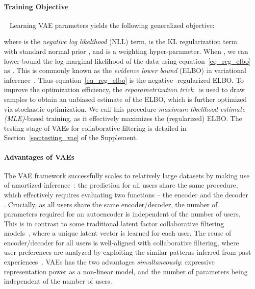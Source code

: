 \documentclass{article} \usepackage{iclr2020_conference,times}
\def\eqref#1{equation~\ref{#1}}
\begin{document}
\paragraph{Training Objective}~\hspace{-2mm}
Learning VAE parameters  yields the following generalized objective:
\vspace{-1mm}

where  is the {\it negative log likelihood} (NLL) term,  is the KL regularization term with standard normal prior , and  is a weighting hyper-parameter.
When , we can lower-bound the log marginal likelihood of the data using \eqref{eq_reg_elbo} as
.
This is commonly known as the {\it evidence lower bound} (ELBO) in variational inference~\citep{blei2017variational}. Thus \eqref{eq_reg_elbo} is the negative -regularized ELBO. To improve the optimization efficiency, the {\it reparametrization trick}~\citep{kingma2013auto,rezende2014stochastic} is used to draw samples  to obtain an unbiased estimate of the ELBO, which is further optimized via stochastic optimization.
We call this procedure {\it maximum likelihood estimate (MLE)}-based training, as it effectively maximizes the (regularized) ELBO. The testing stage of VAEs for collaborative filtering is detailed in Section~\ref{sec:testing_vae} of the Supplement.




















\paragraph{Advantages of VAEs}
The VAE framework successfully scales to relatively large datasets by making use of amortized inference~\citep{gershman2014amortized}: the prediction for all users share the same procedure, which effectively requires evaluating two functions -- the encoder  and the decoder . Crucially, as all users share the same encoder/decoder, the number of parameters required for an autoencoder is independent of the number of users. This is in contrast to some traditional latent factor collaborative filtering
models~\citep{paterek2007improving,hu2008collaborative,mnih2008probabilistic}, where a unique latent vector is learned for each user. The reuse of encoder/decoder for all users is well-aligned with collaborative filtering, where user preferences are analyzed by exploiting the similar patterns inferred from past experiences~\citep{liang2018variational}. VAEs has the two advantages {\em simultaneously}: expressive representation power as a non-linear model, and the number of parameters being independent of the number of users.
\end{document}
